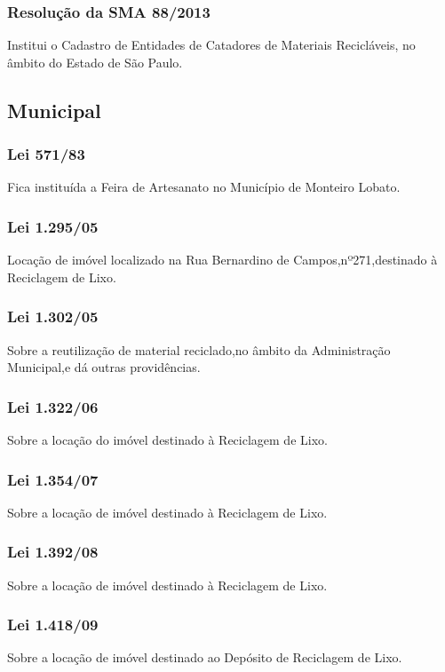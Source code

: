 \begin{subapend}
\begin{subsubapend}
		\subsubsection{Resolução da SMA 88/2013}
		Institui o Cadastro de Entidades de Catadores de Materiais Recicláveis, no âmbito do Estado de São Paulo.
		
	\end{subsubapend}
\end{subapend}


\begin{subapend}
	\subsection{Municipal}
	\begin{subsubapend}
		\item \subsubsection{Lei 571/83}
		Fica instituída a Feira de Artesanato no Município de Monteiro Lobato.
		\subsubsection{Lei 1.295/05}
		Locação de imóvel localizado na Rua Bernardino de Campos,nº271,destinado à Reciclagem de Lixo.
		\subsubsection{Lei 1.302/05}
		Sobre a reutilização de material reciclado,no âmbito da Administração Municipal,e dá outras providências.
		\subsubsection{Lei 1.322/06}
		Sobre a locação do imóvel destinado à Reciclagem de Lixo.
		\subsubsection{Lei 1.354/07}
		Sobre a locação de imóvel destinado à Reciclagem de Lixo.
		\subsubsection{Lei 1.392/08}
		Sobre a locação de imóvel destinado à Reciclagem de Lixo.
		\subsubsection{Lei 1.418/09}
		Sobre a locação de imóvel destinado ao Depósito de Reciclagem de Lixo.

\end{subsubapend}
\end{subapend}
